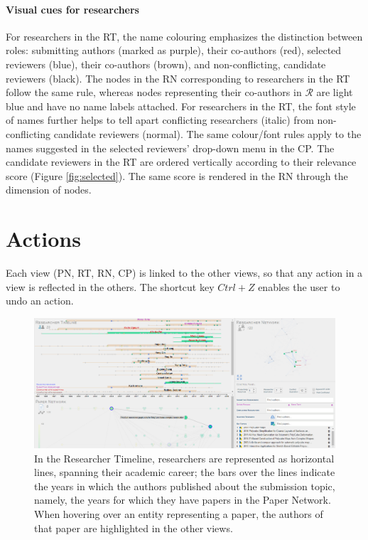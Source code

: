 \paragraph*{Visual cues for researchers} 
For researchers in the RT, the name colouring emphasizes the distinction between roles: submitting authors (marked as purple), their co-authors (red), selected reviewers (blue), their co-authors (brown), and non-conflicting, candidate reviewers (black). The nodes in the RN corresponding to researchers in the RT follow the same rule, whereas nodes representing their co-authors in $\mathcal{R}$ are light blue and have no name labels attached.   
For researchers in the RT, the font style of names further helps to tell apart conflicting researchers (italic) from non-conflicting candidate reviewers (normal). The same colour/font rules apply to the names suggested in the selected reviewers' drop-down menu in the CP.
The candidate reviewers in the RT are ordered vertically according to their relevance score (Figure \ref{fig:selected}). The same score is rendered in the RN through the dimension of nodes.  

\section{Actions}
\label{subsec:actions}

Each view (PN, RT, RN, CP) is linked to the other views, so that any action in a view is reflected in the others. The shortcut key $Ctrl+Z$ enables the user to undo an action.

\begin{figure}[!t]
    \centering
    \includegraphics[width=\textwidth]{fig/timeline_paperhover.png}
    \caption{In the Researcher Timeline, researchers are represented as horizontal lines, spanning their academic career; the bars over the lines indicate the years in which the authors published about the submission topic, namely, the years for which they have papers in the Paper Network. When hovering over an entity representing a paper, the authors of that paper are highlighted in the other views.}
    \label{fig:overpaper}
\end{figure}

